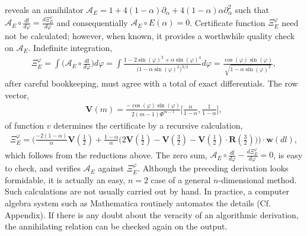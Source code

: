 \documentclass[nofootinbib,preprint]{revtex4-1}
\begin{document}
reveals an annihilator 
$\mathcal{A}_E = 1 + 4(1-\alpha)\partial_{\alpha} + 4(1-\alpha)\alpha\partial_{\alpha}^2$ such
that $\mathcal{A}_E \circ \frac{dl}{d\varphi} = \frac{d\Xi_E^{\varphi}}{d\varphi}$ and consequentially
$\mathcal{A}_E \circ E(\alpha) = 0$. Certificate function $\Xi_E^{\varphi}$ need not be calculated; 
however, when known, it provides a worthwhile quality check on $\mathcal{A}_E$. Indefinite 
integration, 
\begin{eqnarray}
\Xi_E^{\varphi} = \int \bigg(\mathcal{A}_E \circ \frac{dl}{d\varphi}\bigg) d\varphi 
=\int \frac{1-2\sin(\varphi)^2+\alpha \sin(\varphi)^4}{\big(1-\alpha \sin(\varphi)^2\big)^{3/2}} d\varphi
=  \frac{\cos(\varphi)\sin(\varphi)}{\sqrt{1-\alpha \sin(\varphi)^2}}, \nonumber
\end{eqnarray}
after careful bookkeeping, must agree with a total of exact differentials. The row vector,
\begin{eqnarray}
\mathbf{V}(m)=\frac{-\cos(\varphi)\sin(\varphi)}{2(m-1)\Phi^{m-1}}\bigg[\frac{\alpha}{1-\alpha},\frac{1}{1-\alpha}\bigg], \nonumber
\end{eqnarray}
of function $v$ determines the certificate by a recursive calculation,
\begin{eqnarray}
\Xi_E^{\varphi} = \Bigg(\frac{-2(1-\alpha)}{\alpha}\mathbf{V}(\tfrac{1}{2})
+\frac{1-\alpha}{\alpha}\Big(2\mathbf{V}(\tfrac{1}{2})
-\mathbf{V}(\tfrac{3}{2})-\mathbf{V}(\tfrac{1}{2})\cdot
\mathbf{R}(\tfrac{3}{2}) \Big) \Bigg) \cdot \mathbf{w}(dl), 
\nonumber
\end{eqnarray}
which follows from the reductions above. The zero sum, 
$\mathcal{A}_E \circ \frac{dl}{d\varphi}-\frac{d\Xi_E^{\varphi}}{d\varphi}=0$, is 
easy to check, and verifies $\mathcal{A}_E$ against $\Xi_E^{\varphi}$.
Although the preceding derivation looks formidable, it is actually an 
easy, $n=2$ case of a general $n$-dimensional 
method. Such calculations are not usually carried out by hand. In practice, a 
computer algebra system such as Mathematica routinely automates the details 
(Cf. Appendix). If there is any doubt about the veracity of an algorithmic 
derivation, the annihilating relation can be checked again on the output. 
\end{document}
